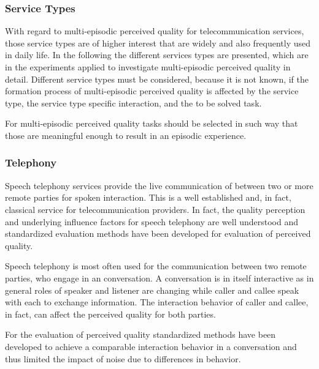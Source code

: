 \subsubsection{Service Types}
With regard to multi-episodic perceived quality for telecommunication services, those service types are of higher interest that are widely and also frequently used in daily life.
In the following the different services types are presented, which are in the experiments applied to investigate multi-episodic perceived quality in detail.
Different service types must be considered, because it is not known, if the formation process of multi-episodic perceived quality is affected by the service type, the service type specific interaction, and the to be solved task.

For multi-episodic perceived quality tasks should be selected in such way that those are meaningful enough to result in an episodic experience.

\subsubsection*{Telephony}
Speech telephony services provide the live communication of between two or more remote parties for spoken interaction.
This is a well established and, in fact, classical service for telecommunication providers.
In fact, the quality perception and underlying influence factors for speech telephony are well understood and standardized evaluation methods have been developed for evaluation of perceived quality.

Speech telephony is most often used for the communication between two remote parties, who engage in an conversation.
A conversation is in itself interactive as in general roles of speaker and listener are changing while caller and callee speak with each to exchange information.
The interaction behavior of caller and callee, in fact, can affect the perceived quality for both parties.

For the evaluation of perceived quality standardized methods have been developed to achieve a comparable interaction behavior in a conversation and thus limited the impact of noise due to differences in behavior.

